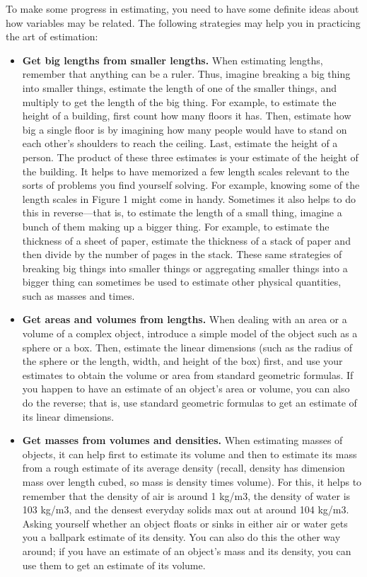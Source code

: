 \documentclass{report}
\begin{document}
    \pagebreak 
    \bigbreak \noindent 
    To make some progress in estimating, you need to have some definite ideas about how variables may be related. The following strategies may help you in practicing the art of estimation:
    \bigbreak \noindent 
    \begin{itemize}
        \item \textbf{Get big lengths from smaller lengths.} When estimating lengths, remember that anything can be a ruler. Thus, imagine breaking a big thing into smaller things, estimate the length of one of the smaller things, and multiply to get the length of the big thing. For example, to estimate the height of a building, first count how many floors it has. Then, estimate how big a single floor is by imagining how many people would have to stand on each other’s shoulders to reach the ceiling. Last, estimate the height of a person. The product of these three estimates is your estimate of the height of the building. It helps to have memorized a few length scales relevant to the sorts of problems you find yourself solving. For example, knowing some of the length scales in Figure 1 might come in handy. Sometimes it also helps to do this in reverse—that is, to estimate the length of a small thing, imagine a bunch of them making up a bigger thing. For example, to estimate the thickness of a sheet of paper, estimate the thickness of a stack of paper and then divide by the number of pages in the stack. These same strategies of breaking big things into smaller things or aggregating smaller things into a bigger thing can sometimes be used to estimate other physical quantities, such as masses and times.
        \item \textbf{Get areas and volumes from lengths.} When dealing with an area or a volume of a complex object, introduce a simple model of the object such as a sphere or a box. Then, estimate the linear dimensions (such as the radius of the sphere or the length, width, and height of the box) first, and use your estimates to obtain the volume or area from standard geometric formulas. If you happen to have an estimate of an object’s area or volume, you can also do the reverse; that is, use standard geometric formulas to get an estimate of its linear dimensions.
        \item \textbf{Get masses from volumes and densities.} When estimating masses of objects, it can help first to estimate its volume and then to estimate its mass from a rough estimate of its average density (recall, density has dimension mass over length cubed, so mass is density times volume). For this, it helps to remember that the density of air is around 1 kg/m3, the density of water is 103 kg/m3, and the densest everyday solids max out at around 104 kg/m3. Asking yourself whether an object floats or sinks in either air or water gets you a ballpark estimate of its density. You can also do this the other way around; if you have an estimate of an object’s mass and its density, you can use them to get an estimate of its volume.

\end{itemize}
\end{document}
